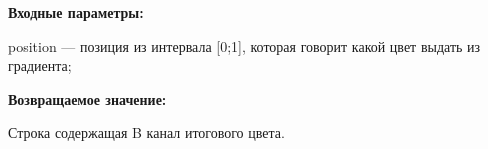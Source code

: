 \textbf{Входные параметры:}  

position --- позиция из интервала [0;1], которая говорит какой цвет выдать из градиента;

\textbf{Возвращаемое значение:}

Строка содержащая B канал итогового цвета.